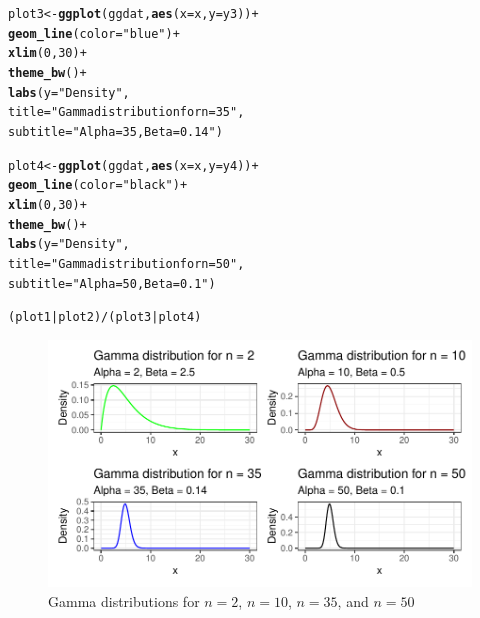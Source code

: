 \documentclass{article}\usepackage[]{graphicx}\usepackage[]{color}
\makeatletter
\def\maxwidth{ %
  \ifdim\Gin@nat@width>\linewidth
    \linewidth
  \else
    \Gin@nat@width
  \fi
}
\newcommand{\hlnum}[1]{\textcolor[rgb]{0.686,0.059,0.569}{#1}}%
\newcommand{\hlstr}[1]{\textcolor[rgb]{0.192,0.494,0.8}{#1}}%
\newcommand{\hlopt}[1]{\textcolor[rgb]{0,0,0}{#1}}%
\newcommand{\hlstd}[1]{\textcolor[rgb]{0.345,0.345,0.345}{#1}}%
\newcommand{\hlkwb}[1]{\textcolor[rgb]{0.69,0.353,0.396}{#1}}%
\newcommand{\hlkwc}[1]{\textcolor[rgb]{0.333,0.667,0.333}{#1}}%
\newcommand{\hlkwd}[1]{\textcolor[rgb]{0.737,0.353,0.396}{\textbf{#1}}}%
\newenvironment{kframe}{%
 \def\at@end@of@kframe{}%
 \ifinner\ifhmode%
  \def\at@end@of@kframe{\end{minipage}}%
  \begin{minipage}{\columnwidth}%
 \fi\fi%
 \def\FrameCommand##1{\hskip\@totalleftmargin \hskip-\fboxsep
 \colorbox{shadecolor}{##1}\hskip-\fboxsep
     \hskip-\linewidth \hskip-\@totalleftmargin \hskip\columnwidth}%
 \MakeFramed {\advance\hsize-\width
   \@totalleftmargin\z@ \linewidth\hsize
   \@setminipage}}%
 {\par\unskip\endMakeFramed%
 \at@end@of@kframe}
\newenvironment{knitrout}{}{} %
\makeatother
\begin{document}
\begin{enumerate}
\begin{enumerate}
\begin{knitrout}
\begin{kframe}
\begin{alltt}
\hlstd{plot3}\hlkwb{<-}\hlkwd{ggplot}\hlstd{(ggdat,} \hlkwd{aes}\hlstd{(}\hlkwc{x}\hlstd{=x,} \hlkwc{y}\hlstd{=y3))}\hlopt{+}
  \hlkwd{geom_line}\hlstd{(}\hlkwc{color}\hlstd{=}\hlstr{"blue"}\hlstd{)}\hlopt{+}
  \hlkwd{xlim}\hlstd{(}\hlnum{0}\hlstd{,}\hlnum{30}\hlstd{)}\hlopt{+}
  \hlkwd{theme_bw}\hlstd{()}\hlopt{+}
  \hlkwd{labs}\hlstd{(}\hlkwc{y}\hlstd{=}\hlstr{"Density"}\hlstd{,}
       \hlkwc{title}\hlstd{=}\hlstr{"Gamma distribution for n = 35"}\hlstd{,}
       \hlkwc{subtitle}\hlstd{=}\hlstr{"Alpha = 35, Beta = 0.14"}\hlstd{)}

\hlstd{plot4}\hlkwb{<-}\hlkwd{ggplot}\hlstd{(ggdat,} \hlkwd{aes}\hlstd{(}\hlkwc{x}\hlstd{=x,} \hlkwc{y}\hlstd{=y4))}\hlopt{+}
  \hlkwd{geom_line}\hlstd{(}\hlkwc{color}\hlstd{=}\hlstr{"black"}\hlstd{)}\hlopt{+}
  \hlkwd{xlim}\hlstd{(}\hlnum{0}\hlstd{,}\hlnum{30}\hlstd{)}\hlopt{+}
  \hlkwd{theme_bw}\hlstd{()}\hlopt{+}
  \hlkwd{labs}\hlstd{(}\hlkwc{y}\hlstd{=}\hlstr{"Density"}\hlstd{,}
       \hlkwc{title}\hlstd{=}\hlstr{"Gamma distribution for n = 50"}\hlstd{,}
       \hlkwc{subtitle}\hlstd{=}\hlstr{"Alpha = 50, Beta = 0.1"}\hlstd{)}

\hlstd{(plot1}\hlopt{|}\hlstd{plot2)}\hlopt{/}\hlstd{(plot3}\hlopt{|}\hlstd{plot4)}
\end{alltt}
\end{kframe}
\end{knitrout}

\begin{figure}[H]
\begin{center}
\begin{knitrout}
\color{fgcolor}
\includegraphics[width=\maxwidth]{figure/unnamed-chunk-8-1} 
\end{knitrout}
\caption{Gamma distributions for $n=2$, $n=10$, $n=35$, and $n=50$}
\label{p2plot3}
\end{center}
\end{figure}


\end{enumerate}
\end{enumerate}
\end{document}
